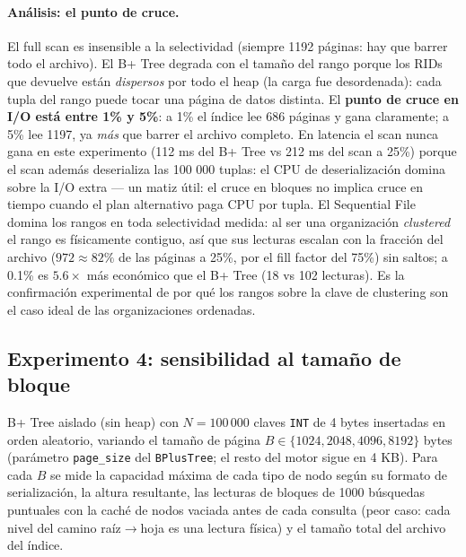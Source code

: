 \documentclass[11pt]{article}
\begin{document}
\paragraph{Análisis: el punto de cruce.}
El full scan es insensible a la selectividad (siempre 1192 páginas: hay que
barrer todo el archivo). El B+ Tree degrada con el tamaño del rango porque
los RIDs que devuelve están \emph{dispersos} por todo el heap (la carga fue
desordenada): cada tupla del rango puede tocar una página de datos distinta.
El \textbf{punto de cruce en I/O está entre 1\% y 5\%}: a 1\% el índice lee
686 páginas y gana claramente; a 5\% lee 1197, ya \emph{más} que barrer el
archivo completo. En latencia el scan nunca gana en este experimento (112 ms
del B+ Tree vs 212 ms del scan a 25\%) porque el scan además deserializa las
100 000 tuplas: el CPU de deserialización domina sobre la I/O extra — un
matiz útil: el cruce en bloques no implica cruce en tiempo cuando el plan
alternativo paga CPU por tupla. El Sequential File domina los rangos en toda
selectividad medida: al ser una organización \emph{clustered} el rango es
físicamente contiguo, así que sus lecturas escalan con la fracción del
archivo ($972 \approx 82\%$ de las páginas a 25\%, por el fill factor del
75\%) sin saltos; a 0.1\% es $5.6\times$ más económico que el B+ Tree (18 vs
102 lecturas). Es la confirmación experimental de por qué los rangos sobre
la clave de clustering son el caso ideal de las organizaciones ordenadas.

\subsection{Experimento 4: sensibilidad al tamaño de bloque}

B+ Tree aislado (sin heap) con $N = 100\,000$ claves \texttt{INT} de 4
bytes insertadas en orden aleatorio, variando el tamaño de página
$B \in \{1024, 2048, 4096, 8192\}$ bytes (parámetro \texttt{page\_size}
del \texttt{BPlusTree}; el resto del motor sigue en 4 KB). Para cada $B$
se mide la capacidad máxima de cada tipo de nodo según su formato de
serialización, la altura resultante, las lecturas de bloques de 1000
búsquedas puntuales con la caché de nodos vaciada antes de cada consulta
(peor caso: cada nivel del camino raíz$\to$hoja es una lectura física) y
el tamaño total del archivo del índice.
\end{document}
